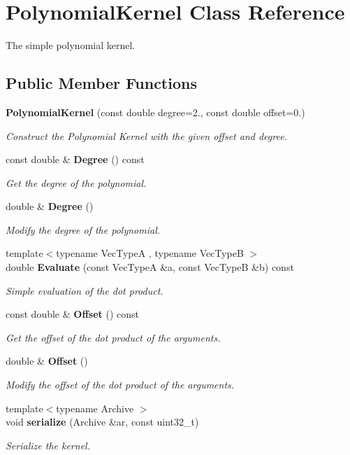 \section{Polynomial\+Kernel Class Reference}
\label{classmlpack_1_1kernel_1_1PolynomialKernel}


The simple polynomial kernel.  


\subsection*{Public Member Functions}
\begin{DoxyCompactItemize}
\item 
\textbf{ Polynomial\+Kernel} (const double degree=2., const double offset=0.)
\begin{DoxyCompactList}\small\item\em Construct the Polynomial Kernel with the given offset and degree. \end{DoxyCompactList}\item 
const double \& \textbf{ Degree} () const
\begin{DoxyCompactList}\small\item\em Get the degree of the polynomial. \end{DoxyCompactList}\item 
double \& \textbf{ Degree} ()
\begin{DoxyCompactList}\small\item\em Modify the degree of the polynomial. \end{DoxyCompactList}\item 
{\footnotesize template$<$typename Vec\+TypeA , typename Vec\+TypeB $>$ }\\double \textbf{ Evaluate} (const Vec\+TypeA \&a, const Vec\+TypeB \&b) const
\begin{DoxyCompactList}\small\item\em Simple evaluation of the dot product. \end{DoxyCompactList}\item 
const double \& \textbf{ Offset} () const
\begin{DoxyCompactList}\small\item\em Get the offset of the dot product of the arguments. \end{DoxyCompactList}\item 
double \& \textbf{ Offset} ()
\begin{DoxyCompactList}\small\item\em Modify the offset of the dot product of the arguments. \end{DoxyCompactList}\item 
{\footnotesize template$<$typename Archive $>$ }\\void \textbf{ serialize} (Archive \&ar, const uint32\+\_\+t)
\begin{DoxyCompactList}\small\item\em Serialize the kernel. \end{DoxyCompactList}\end{DoxyCompactItemize}


